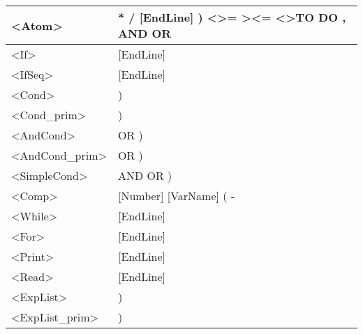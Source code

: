 \documentclass[12pt]{article}
\begin{document}
\begin{table}[H]
\begin{tabular}{|l|l|}
		\textless{}Atom\textgreater{}            & * / {[}EndLine{]} ) \textless \textgreater{}= \textgreater \textless{}= \textless{}\textgreater TO DO , AND OR \\ \hline
		\textless{}If\textgreater{}              & {[}EndLine{]}                                                                                                  \\ \hline
		\textless{}IfSeq\textgreater{}           & {[}EndLine{]}                                                                                                  \\ \hline
		\textless{}Cond\textgreater{}            & )                                                                                                              \\ \hline
		\textless{}Cond\_prim\textgreater{}      & )                                                                                                              \\ \hline
		\textless{}AndCond\textgreater{}         & OR )                                                                                                           \\ \hline
		\textless{}AndCond\_prim\textgreater{}   & OR )                                                                                                           \\ \hline
		\textless{}SimpleCond\textgreater{}      & AND OR )                                                                                                       \\ \hline
		\textless{}Comp\textgreater{}            & {[}Number{]} {[}VarName{]} ( -                                                                                 \\ \hline
		\textless{}While\textgreater{}           & {[}EndLine{]}                                                                                                  \\ \hline
		\textless{}For\textgreater{}             & {[}EndLine{]}                                                                                                  \\ \hline
		\textless{}Print\textgreater{}           & {[}EndLine{]}                                                                                                  \\ \hline
		\textless{}Read\textgreater{}            & {[}EndLine{]}                                                                                                  \\ \hline
		\textless{}ExpList\textgreater{}         & )                                                                                                              \\ \hline
		\textless{}ExpList\_prim\textgreater{}   & )                                                                                                              \\ \hline
	\end{tabular}
\end{table}
\end{document}
